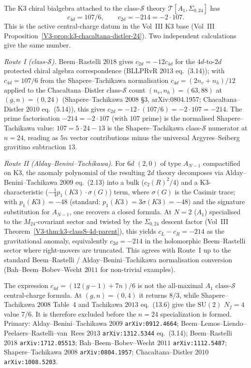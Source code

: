 \begin{remark}[$c_{2d} = -214$ as class-$\mathcal S$ anomaly output]
\label{rem:3dg-witten-c2d-minus-214-classS}
%
%
%
The K3 chiral bialgebra attached to the class-$\mathcal S$ theory
\(\mathcal T[A_1,\Sigma_{0,24}]\) has
\[
 c_{4d}=107/6,\qquad c_{2d}=-214=-2\cdot 107.
\]
This is the active central-charge datum in the Vol~III K3 base
(Vol~III Proposition~\ref*{V3-prop:k3-chacaltana-distler-24}).
Two independent calculations give the same number.

\emph{Route I (class-$\mathcal{S}$).} Beem--Rastelli $2018$ gives
$c_{2d} = -12 c_{4d}$ for the $4d$-to-$2d$ protected chiral algebra
correspondence (BLLPRvR $2013$ eq.~(3.14)); with
$c_{4d} = 107/6$ from the Shapere--Tachikawa normalisation
$c_{4d} = (2n_v + n_h)/12$ applied to the Chacaltana--Distler
class-$\mathcal S$ count $(n_v, n_h) = (63, 88)$ at
$(g, n) = (0, 24)$ (Shapere--Tachikawa $2008$ \S 3, arXiv:0804.1957;
Chacaltana--Distler $2010$ eq.~(5.14)), this gives
$c_{2d} = -12\cdot(107/6) = -2\cdot 107 = -214$. The prime
factorisation $-214 = -2\cdot 107$ (with $107$ prime) is the
normalised Shapere--Tachikawa value: $107 =
5\cdot 24 - 13$ is the Shapere--Tachikawa class-$\mathcal S$
numerator at $n = 24$, reading as $5n$ vector contributions minus
the universal Argyres--Seiberg gravitino subtraction $13$.

\emph{Route II (Alday--Benini--Tachikawa).} For $6d$ $(2,0)$ of type
$A_{N-1}$ compactified on K3, the anomaly polynomial of the resulting
$2d$ theory decomposes via Alday--Benini--Tachikawa $2009$ eq.~(2.13)
into a bulk ($c_2(R)^2/4$) and a K3-characteristic
($-\tfrac{1}{4} p_1(K3)\cdot\sigma(G)$) term, where $\sigma(G)$ is
the Casimir trace; with $p_1(K3) = -48$ (standard:
$p_1(K3) = 3\sigma(K3) = -48$) and the signature substitution for
$A_{N-1}$, one recovers a closed formula. At $N = 2$ ($A_1$)
specialised to the $M_{24}$-covariant sector and twisted by the
$\Sigma_{0,24}$ descent factor (Vol~III
Theorem~\ref*{V3-thm:k3-classS-4d-parent}), this yields
$c_L - c_R = -214$ as the gravitational anomaly, equivalently
$c_{2d} = -214$ in the holomorphic Beem--Rastelli sector where
right-movers are truncated. This agrees with Route~I up to the
standard Beem--Rastelli / Alday--Benini--Tachikawa normalisation
conversion (Bah--Beem--Bobev--Wecht $2011$ for non-trivial examples).

The expression $c_{4d}=(12(g-1)+7n)/6$ is not the all-maximal
$A_1$ class-$\mathcal S$ central-charge formula. At $(g,n)=(0,4)$ it
returns $8/3$, while Shapere--Tachikawa $2008$ Table~4 and
Tachikawa $2013$ eq.~(13.6) give the $\mathrm{SU}(2)$
$N_f=4$ value $7/6$. It is therefore excluded before the
$n=24$ specialization is formed. Primary: Alday--Benini--Tachikawa $2009$
\texttt{arXiv:0912.4664};
Beem--Lemos--Liendo--Peelaers--Rastelli--van~Rees $2013$
\texttt{arXiv:1312.5344} eq.~(3.14); Beem--Rastelli $2018$
\texttt{arXiv:1712.05513}; Bah--Beem--Bobev--Wecht $2011$
\texttt{arXiv:1112.5487};
Shapere--Tachikawa $2008$ \texttt{arXiv:0804.1957};
Chacaltana--Distler $2010$ \texttt{arXiv:1008.5203}.
\end{remark}


